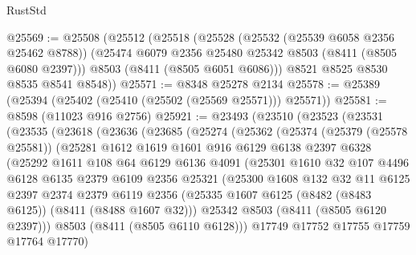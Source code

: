 \begin{lexlean}{RustStd}
\begin{coremodule}
@25569 := @25508
    (@25512
      (@25518
        (@25528
          (@25532 (@25539 @6058 @2356 @25462 @8788))
          (@25474 @6079 @2356 @25480 @25342 @8503 (@8411 (@8505 @6080 @2397)))
          @8503
          (@8411 (@8505 @6051 @6086)))
        @8521
        @8525
        @8530
        @8535
        @8541
        @8548))
@25571 := @8348 @25278 @2134
@25578 := @25389 (@25394 (@25402 (@25410 (@25502 (@25569 @25571))) @25571))
@25581 := @8598 (@11023 @916 @2756)
@25921 := @23493
    (@23510
      (@23523
        (@23531
          (@23535
            (@23618
              (@23636
                (@23685
                  (@25274
                    (@25362
                      (@25374
                        (@25379 (@25578 @25581))
                        (@25281
                          @1612
                          @1619
                          @1601
                          @916
                          @6129
                          @6138
                          @2397
                          @6328
                          (@25292
                            @1611
                            @108
                            @64
                            @6129
                            @6136
                            @4091
                            (@25301
                              @1610
                              @32
                              @107
                              @4496
                              @6128
                              @6135
                              @2379
                              @6109
                              @2356
                              @25321
                              (@25300
                                @1608
                                @132
                                @32
                                @11
                                @6125
                                @2397
                                @2374
                                @2379
                                @6119
                                @2356
                                (@25335 @1607 @6125 (@8482 (@8483 @6125)) (@8411 (@8488 @1607 @32)))
                                @25342
                                @8503
                                (@8411 (@8505 @6120 @2397)))
                              @8503
                              (@8411 (@8505 @6110 @6128)))
                            @17749
                            @17752
                            @17755
                            @17759
                            @17764
                            @17770)

\end{coremodule}
\end{lexlean}
